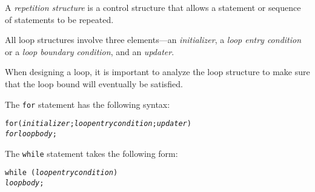 \label{summaryof-important-points}
\begin{SMBL}
\item  A {\it repetition structure} is a control structure
that allows a statement or sequence of statements to be repeated.

\item  All loop structures involve three elements---an {\it initializer}, 
a {\it loop entry condition} or a {\it loop boundary condition}, and
an {\it updater}.

\item When designing a loop, it is important to analyze the loop structure
to make sure that the loop bound will eventually be satisfied.

\item The {\tt for} statement has the following syntax:

\begin{alltt}
for ( {\it initializer} ; {\it loop entry condition} ; {\it updater} )
    {\it for loop body} ; 
\end{alltt} 


\item The {\tt while} statement takes the following form:

\begin{jjjlisting}
\begin{alltt}
{\tt while (} {\it loop entry condition} {\tt)}   
    {\it loop body} ;
\end{alltt}
\end{jjjlisting}


\end{SMBL}
